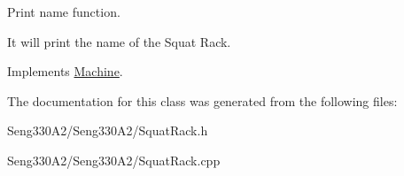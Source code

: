 Print name function. 

It will print the name of the Squat Rack. 

Implements \hyperlink{class_machine}{Machine}.



The documentation for this class was generated from the following files\+:\begin{DoxyCompactItemize}
\item 
Seng330\+A2/\+Seng330\+A2/Squat\+Rack.\+h\item 
Seng330\+A2/\+Seng330\+A2/Squat\+Rack.\+cpp\end{DoxyCompactItemize}
